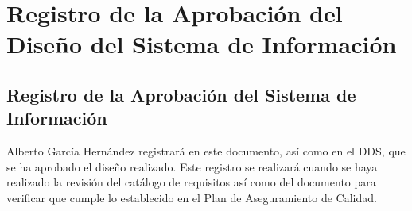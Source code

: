 \section{Registro de la Aprobación del Diseño del Sistema de Información}
\subsection{Registro de la Aprobación del Sistema de Información}
\par Alberto García Hernández registrará en este documento, así como en el DDS, que se ha aprobado el diseño realizado. Este registro se realizará cuando se haya realizado la revisión del catálogo de requisitos así como del documento para verificar que cumple lo establecido en el Plan de Aseguramiento de Calidad.
